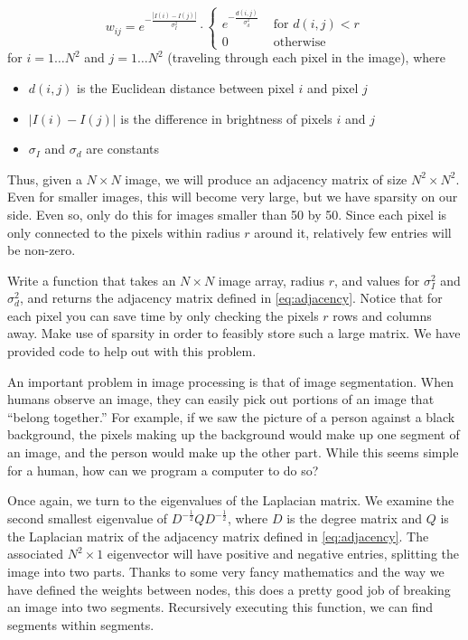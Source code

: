 \begin{equation}
\label{eq:adjacency}
w_{ij} = e^{-\frac{|I(i) - I(j)|}{\sigma_I^2}} \cdot \begin{cases} e^{-\frac{d(i,j)}{\sigma_d^2}} & \mbox{ for $d(i,j) < r$} \\ 0 & \mbox{ otherwise} \end{cases}
\end{equation}
for $i = 1 \hdots N^2$ and $j = 1 \hdots N^2$ (traveling through each pixel in the image), where
\begin{itemize}
	\item$d(i,j)$ is the Euclidean distance between pixel $i$ and pixel $j$
	\item $|I(i) - I(j)|$ is the difference in brightness of pixels $i$ and $j$
	\item $\sigma_I$ and $\sigma_d$ are constants
\end{itemize}
Thus, given a $N\times N$ image, we will produce an adjacency matrix of size $N^2\times N^2$.
Even for smaller images, this will become very large, but we have sparsity on our side.
Even so, only do this for images smaller than 50 by 50.
Since each pixel is only connected to the pixels within radius $r$ around it, relatively few entries will be non-zero.

\begin{problem}
Write a function  that takes an $N \times N$ image array, radius $r$, and values for
$\sigma_I^2$ and $\sigma_d^2$, and returns the adjacency matrix defined in \eqref{eq:adjacency}.
Notice that for each pixel you can save time by only checking the pixels $r$ rows and columns away.
Make use of sparsity in order to feasibly store such a large matrix.
We have provided code to help out with this problem.
\end{problem}

An important problem in image processing is that of image segmentation.
When humans observe an image, they can easily pick out portions of an image that ``belong together.''
For example, if we saw the picture of a person against a black background, the pixels making up the background would make up one segment of an image, and the person would make up the other part.
While this seems simple for a human, how can we program a computer to do so?

Once again, we turn to the eigenvalues of the Laplacian matrix.
We examine the second smallest eigenvalue of $D^{-\frac{1}{2}}QD^{-\frac{1}{2}}$, where $D$ is the degree matrix and $Q$ is the Laplacian matrix of the adjacency matrix defined in \eqref{eq:adjacency}.
The associated $N^2 \times 1$ eigenvector will have positive and negative entries, splitting the image into two parts.
Thanks to some very fancy mathematics and the way we have defined the weights between nodes, this does a pretty good job of breaking an image into two segments.
Recursively executing this function, we can find segments within segments.

